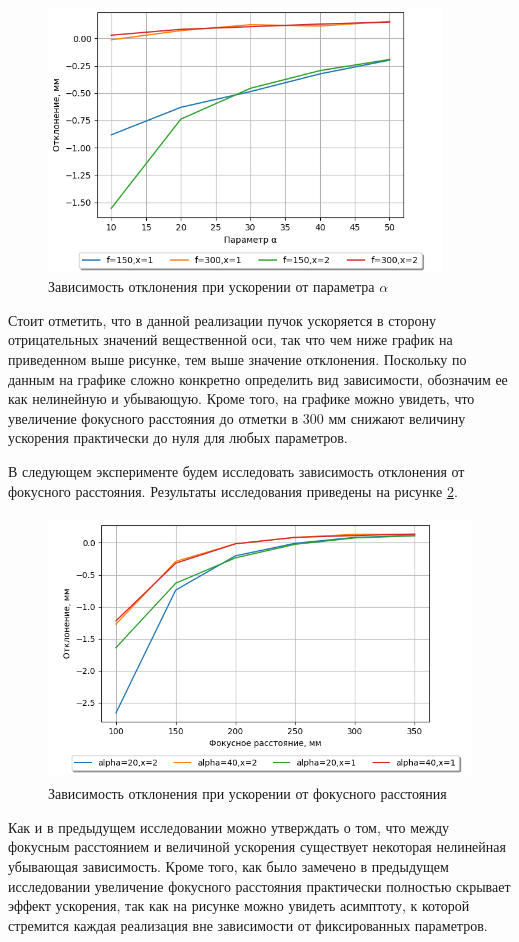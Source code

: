 {    \begin{figure}[H]
        \centering
        \includegraphics[height = 7cm]{plots/!graphics_acc_param.png}
        \caption{Зависимость отклонения при ускорении от параметра $\alpha$}
        \label{acc_param}
    \end{figure}
    \vspace{0.5cm}
    Стоит отметить, что в данной реализации пучок ускоряется в сторону отрицательных значений вещественной оси, так что чем ниже график на
    приведенном выше рисунке, тем выше значение отклонения.
    Поскольку по данным на графике сложно конкретно определить вид зависимости, обозначим ее как нелинейную и убывающую.
    Кроме того, на графике можно увидеть, что увеличение фокусного расстояния до отметки в 300 мм снижают величину ускорения практически до нуля для любых параметров.

    В следующем эксперименте будем исследовать зависимость отклонения от фокусного расстояния. Результаты исследования приведены на рисунке \ref{acc_focus}.

    \begin{figure}[H]
        \centering
        \includegraphics[height = 7cm]{plots/!graphics_acc_focus.png}
        \caption{Зависимость отклонения при ускорении от фокусного расстояния}
        \label{acc_focus}
    \end{figure}
      \vspace{0.5cm}
    Как и в предыдущем исследовании можно утверждать о том, что между фокусным расстоянием и величиной ускорения существует некоторая нелинейная убывающая зависимость.
    Кроме того, как было замечено в предыдущем исследовании увеличение фокусного расстояния практически полностью скрывает эффект ускорения, так как на рисунке
    можно увидеть асимптоту, к которой стремится каждая реализация вне зависимости от фиксированных параметров.

}
